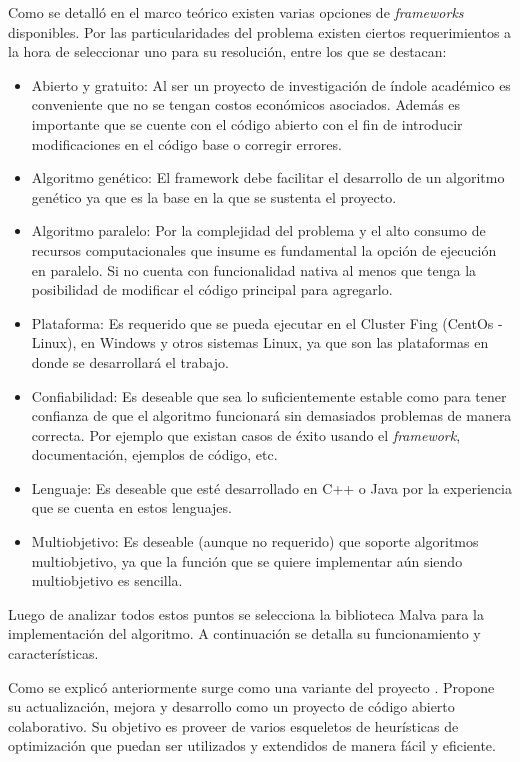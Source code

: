 Como se detalló en el marco teórico existen varias opciones de \emph{frameworks} disponibles. Por las particularidades del problema existen ciertos requerimientos a la hora de seleccionar  uno para su resolución, entre los que se destacan:

\begin{itemize}
	\item Abierto y gratuito: Al ser un proyecto de investigación de índole académico es conveniente que no se tengan costos económicos asociados. Además es importante que se cuente con el código abierto con el fin de introducir modificaciones en el código base o corregir errores.
	\item Algoritmo genético: El framework debe facilitar el desarrollo de un algoritmo genético ya que es la base en la que se sustenta el proyecto.
	\item Algoritmo paralelo: Por la complejidad del problema y el alto consumo de recursos computacionales que insume es fundamental la opción de ejecución en paralelo. Si no cuenta con funcionalidad nativa al menos que tenga la posibilidad de modificar el código principal para agregarlo.
	\item Plataforma: Es requerido que se pueda ejecutar en el Cluster Fing (CentOs - Linux), en Windows y otros sistemas Linux, ya que son las plataformas en donde se desarrollará el trabajo.
	\item Confiabilidad: Es deseable que sea lo suficientemente estable como para tener confianza de que el algoritmo funcionará sin demasiados problemas de manera correcta. Por ejemplo que existan casos de éxito usando el \emph{framework}, documentación, ejemplos de código, etc.
	\item Lenguaje: Es deseable que esté desarrollado en C++ o Java por la experiencia que se cuenta en estos lenguajes. 
	\item Multiobjetivo: Es deseable (aunque no requerido) que soporte algoritmos multiobjetivo, ya que la función que se quiere implementar aún siendo multiobjetivo es sencilla.	
\end{itemize} 

Luego de analizar todos estos puntos se selecciona la biblioteca Malva para la implementación del algoritmo. A continuación se detalla su funcionamiento y características.


Como se explicó anteriormente \citet{Malva} surge como una variante del proyecto \citet{Mallba}. Propone su actualización, mejora y desarrollo como un proyecto de código abierto colaborativo.  Su objetivo es proveer de varios esqueletos de  heurísticas de optimización que puedan ser utilizados y extendidos de manera fácil y eficiente.

